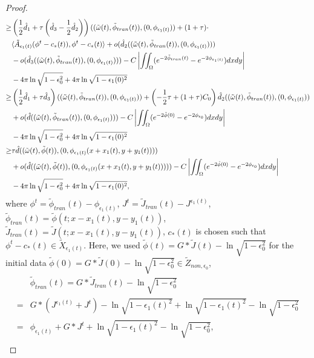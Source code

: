\documentclass[1 [leqno, 11pt]{amsart}
\numberwithin{equation}{section}
\let\ep=\epsilon
\begin{document}
\begin{CJK*}{GBK}{song}
\begin{proof}
\begin{align}
  \geq&\left( {1\over2}\hat d_1+\tau \left(\hat d_3-{1\over2}\hat d_2\right)\right)((\tilde \omega(t),\tilde \phi_{tran}(t)), ( 0, \phi_{\ep_1(t)}))+(1+\tau)\cdot
  \\\nonumber
 &\langle  \tilde A_{\ep_1(t)} (\phi^t-c_*(t)),\phi^t-c_*(t)\rangle+ o(\hat d_2((\tilde \omega(t),\tilde \phi_{tran}(t)),(0,\phi_{\ep_1(t)}))) \\\nonumber
 &-o(\hat d_{3}((\tilde \omega(t),\tilde \phi_{tran}(t)),(0,\phi_{\ep_1(t)})))-C\left|\iint_{\Omega}(e^{-2\tilde \phi_{tran}(t)}-e^{-2\phi_{\ep_1(t)}})dxdy\right|\\\nonumber
 &-4\pi\ln\sqrt{1-\ep_0^2}+4\pi\ln\sqrt{1-\ep_1(0)^2}\\\nonumber
 \geq&\left({1\over2} \hat d_1+\tau \hat d_3\right)((\tilde \omega(t),\tilde \phi_{tran}(t)), ( 0, \phi_{\ep_1(t)}))+\left(-{1\over2}\tau+(1+\tau)C_0\right)\hat d_2((\tilde \omega(t),\tilde \phi_{tran}(t)), ( 0, \phi_{\ep_1(t)}))\\\nonumber
 &
 + o(\hat d((\tilde \omega(t),\tilde \phi_{tran}(t)),(0,\phi_{\ep_1(t)})))-C\left|\iint_{\Omega}(e^{-2\tilde \phi(0)}-e^{-2\phi_{\ep_0}})dxdy\right|
 \\\nonumber
 &-4\pi\ln\sqrt{1-\ep_0^2}+4\pi\ln\sqrt{1-\ep_1(0)^2}\\\nonumber
\geq&\tau \hat d((\tilde \omega(t),\tilde \phi(t)), ( 0, \phi_{\ep_1(t)}(x+x_1(t),y+y_1(t))))\\\nonumber
&+o(\hat d((\tilde \omega(t),\tilde \phi(t)), ( 0, \phi_{\ep_1(t)}(x+x_1(t),y+y_1(t)))))-C\left|\iint_{\Omega}(e^{-2\tilde \phi(0)}-e^{-2\phi_{\ep_0}})dxdy\right|
\\\nonumber
 &-4\pi\ln\sqrt{1-\ep_0^2}+4\pi\ln\sqrt{1-\ep_1(0)^2},
\end{align}
where $\phi^t=\tilde \phi_{tran}(t)-\phi_{\ep_1(t)}$, $J^t=\tilde J_{tran}(t)-J^{\ep_1(t)}$,   $\tilde \phi_{tran}(t)=\tilde \phi(t;x-x_1(t),y-y_1(t))$, $\tilde J_{tran}(t)=\tilde J(t;x-x_1(t),y-y_1(t))$, $c_*(t)$ is chosen such that  $\phi^t-c_*(t)\in \tilde  X_{\ep_1(t)}$. Here, we used
$\tilde \phi(t)=G*\tilde J(t)-\ln\sqrt{1-\ep_0^2}$ for the initial data $\tilde \phi(0)=G*\tilde J(0)-\ln\sqrt{1-\ep_0^2}\in \tilde Z_{non,\ep_0}$,
\begin{align*}
&\tilde \phi_{tran}(t)=G*\tilde J_{tran}(t)-\ln\sqrt{1-\ep_0^2}\\
=&G*(J^{\ep_1(t)}+J^t)-\ln\sqrt{1-\ep_1(t)^2}+\ln\sqrt{1-\ep_1(t)^2}-\ln\sqrt{1-\ep_0^2}\\
=&\phi_{\ep_1(t)}+G*J^t+\ln\sqrt{1-\ep_1(t)^2}-\ln\sqrt{1-\ep_0^2},\\

\end{align*}
\end{proof}
\end{CJK*}
\end{document}

